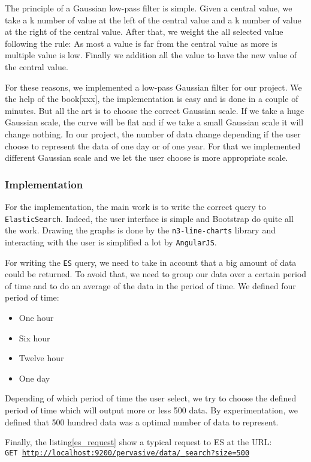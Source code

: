 \documentclass{acm_proc_article-sp}
\begin{document}
The principle of a Gaussian low-pass filter is simple. Given a central value, we take a k number of value at the left of the central value and a k number of value at the right of the central value. After that, we weight the all selected value following the rule:  As most a value is far from the central value as more is multiple value is low. Finally we addition all the value to have the new value of the central value.

For these reasons, we implemented a low-pass Gaussian filter for our project. We the help of the book[xxx], the implementation is easy and is done in a couple of minutes. But all the art is to choose the correct Gaussian scale. If we take a huge Gaussian scale, the curve will be flat and if we take a small Gaussian scale it will change nothing. In our project, the number of data change depending if the user choose to represent the data of one day or of one year. For that we implemented different Gaussian scale and we let the user choose is more appropriate scale. 

\subsubsection{Implementation}
For the implementation, the main work is to write the correct query to \texttt{ElasticSearch}. Indeed, the user interface is simple and Bootstrap do quite all the work. Drawing the graphs is done by the \texttt{n3-line-charts} library and interacting with the user is simplified a lot by \texttt{AngularJS}.

For writing the \texttt{ES} query, we need to take in account that a big amount of data could be returned. To avoid that, we need to group our data over a certain period of time and to do an average of the data in the period of time. We defined four period of time:
\begin{itemize}
\item One hour
\item Six hour
\item Twelve hour
\item One day
\end{itemize}

Depending of which period of time the user select, we try to choose the defined period of time which will output more or less 500 data. By experimentation, we defined that 500 hundred data was a optimal number of data to represent.

Finally, the listing\ref{es_request} show a typical request to ES at the URL:\\
\texttt{GET \url{http://localhost:9200/pervasive/data/_search?size=500}}
\end{document}

